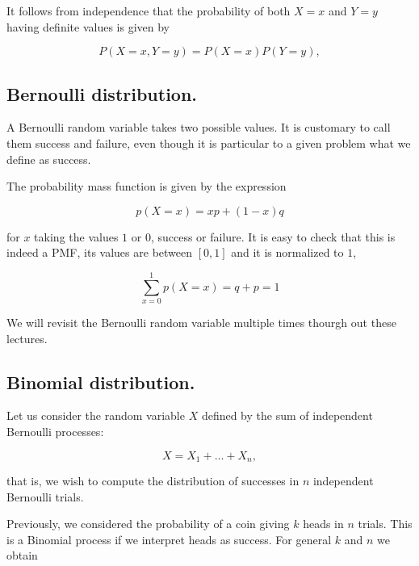 \documentclass[12pt]{article}
\begin{document}
\noindent
It follows from independence that the probability of 
both $X = x$ and $Y = y$ having definite values is
given by

\begin{equation}
P(X = x, Y = y) = 
P(X = x)
P(Y = y),
\end{equation}

\subsection{Bernoulli distribution.}

A Bernoulli random variable takes two possible values.
It is customary to call them success and failure, even though
it is particular to a given problem what we define as success.

The probability mass function is given by the expression

\begin{equation}
p(X = x) = xp + (1 - x)q
\end{equation}

\noindent
for $x$ taking the values $1$ or $0$, success or failure.
It is easy to check that this is indeed a PMF,
its values are between $[0,1]$ and it is normalized to $1$,

\begin{equation}
\sum_{x = 0}^{1} p(X = x) = q + p = 1
\end{equation}

We will revisit the Bernoulli random variable multiple
times thourgh out these lectures.

\subsection{Binomial distribution.}

Let us consider the random variable $X$ defined by the sum of independent 
Bernoulli processes:

\begin{equation}
X = X_{1} + \ldots + X_{n},
\end{equation}

\noindent
that is, we wish to compute the distribution of successes in $n$ independent Bernoulli trials.

Previously, we considered the probability of a coin giving $k$ heads in $n$ trials.
This is a Binomial process if we interpret heads as success.
%
%
%
For general $k$ and $n$ we obtain
\end{document}
